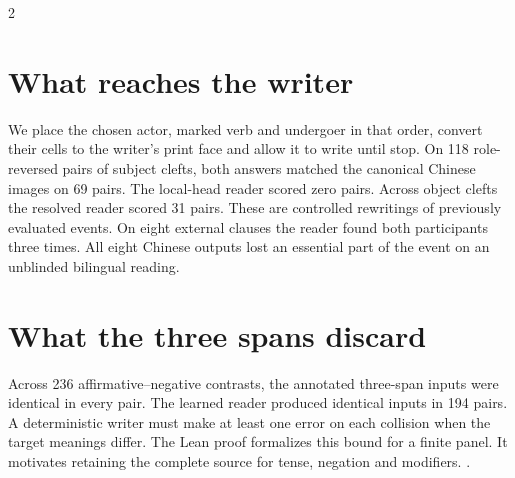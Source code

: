 \begin{multicols}{2}
\section*{What reaches the writer}
We place the chosen actor, marked verb and undergoer in that order, convert their cells to the writer's print face and allow it to write until stop. On 118 role-reversed pairs of subject clefts, both answers matched the canonical Chinese images on 69 pairs. The local-head reader scored zero pairs. Across object clefts the resolved reader scored 31 pairs. These are controlled rewritings of previously evaluated events. On eight external clauses the reader found both participants three times. All eight Chinese outputs lost an essential part of the event on an unblinded bilingual reading.
\section*{What the three spans discard}
Across 236 affirmative--negative contrasts, the annotated three-span inputs were identical in every pair. The learned reader produced identical inputs in 194 pairs. A deterministic writer must make at least one error on each collision when the target meanings differ. The Lean proof formalizes this bound for a finite panel. It motivates retaining the complete source for tense, negation and modifiers. .
\end{multicols}
